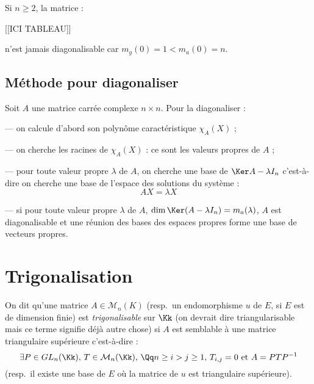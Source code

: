 \documentclass[class=report,crop=false]{standalone}
\newcommand{\GL}{GL}
\begin{document}
\begin{exemple}
Si $n \ge 2$, la matrice :

[[ICI TABLEAU]]


n'est jamais diagonalisable car $m_g(0) = 1 < m_a(0) =n$.
\end{exemple}

\subsection*{Méthode pour diagonaliser}
Soit $A$ une matrice carrée complexe $n \times n$. Pour la diagonaliser :

--- on calcule d'abord son polynôme caractéristique $\chi_A(X)$ ;

--- on cherche les racines de $\chi_A(X)$ : ce sont les valeurs propres de $A$ ;

--- pour toute valeur propre $\lambda$ de $A$, on cherche une base de $\Ker A-\lambda I_n$ c'est-à-dire on cherche une base de l'espace des solutions du système :
\[AX = \lambda X\]

--- si pour toute valeur propre $\lambda$ de $A$, $\dim \Ker (A -\lambda I_n) = m_a(\lambda)$, $A$ est diagonalisable et une réunion des bases des espaces propres forme une base de vecteurs propres.

\section{Trigonalisation}
\begin{definition}
On dit qu'une matrice $A \in \mathcal{M}_n(K)$ (resp.\ un endomorphisme $u$ de $E$, si $E$ est de dimension finie) est {\it trigonalisable} sur $\Kk$ (on devrait dire triangularisable mais ce terme signifie déjà autre chose) si $A$ est semblable à une matrice triangulaire supérieure c'est-à-dire :
\[\exists P \in \GL_n(\Kk),\, T \in \mathcal{M}_n(\Kk),\, \Qq n \ge i > j \ge 1,\, T_{i,j}= 0 \text{ et } A = PTP^{-1}\]
(resp.\ il existe une base de $E$ où la matrice de $u$ est triangulaire supérieure). 
\end{definition}
\end{document}
